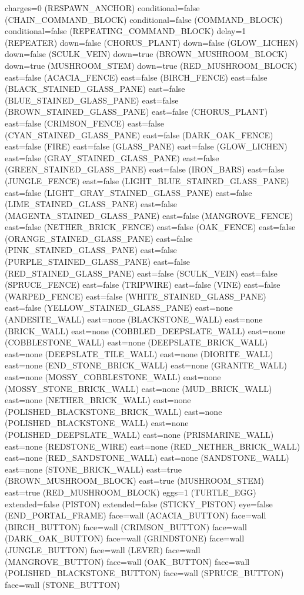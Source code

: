 \documentclass[11pt]{article}
\begin{document}
charges=0 (RESPAWN_ANCHOR)
conditional=false (CHAIN_COMMAND_BLOCK)
conditional=false (COMMAND_BLOCK)
conditional=false (REPEATING_COMMAND_BLOCK)
delay=1 (REPEATER)
down=false (CHORUS_PLANT)
down=false (GLOW_LICHEN)
down=false (SCULK_VEIN)
down=true (BROWN_MUSHROOM_BLOCK)
down=true (MUSHROOM_STEM)
down=true (RED_MUSHROOM_BLOCK)
east=false (ACACIA_FENCE)
east=false (BIRCH_FENCE)
east=false (BLACK_STAINED_GLASS_PANE)
east=false (BLUE_STAINED_GLASS_PANE)
east=false (BROWN_STAINED_GLASS_PANE)
east=false (CHORUS_PLANT)
east=false (CRIMSON_FENCE)
east=false (CYAN_STAINED_GLASS_PANE)
east=false (DARK_OAK_FENCE)
east=false (FIRE)
east=false (GLASS_PANE)
east=false (GLOW_LICHEN)
east=false (GRAY_STAINED_GLASS_PANE)
east=false (GREEN_STAINED_GLASS_PANE)
east=false (IRON_BARS)
east=false (JUNGLE_FENCE)
east=false (LIGHT_BLUE_STAINED_GLASS_PANE)
east=false (LIGHT_GRAY_STAINED_GLASS_PANE)
east=false (LIME_STAINED_GLASS_PANE)
east=false (MAGENTA_STAINED_GLASS_PANE)
east=false (MANGROVE_FENCE)
east=false (NETHER_BRICK_FENCE)
east=false (OAK_FENCE)
east=false (ORANGE_STAINED_GLASS_PANE)
east=false (PINK_STAINED_GLASS_PANE)
east=false (PURPLE_STAINED_GLASS_PANE)
east=false (RED_STAINED_GLASS_PANE)
east=false (SCULK_VEIN)
east=false (SPRUCE_FENCE)
east=false (TRIPWIRE)
east=false (VINE)
east=false (WARPED_FENCE)
east=false (WHITE_STAINED_GLASS_PANE)
east=false (YELLOW_STAINED_GLASS_PANE)
east=none (ANDESITE_WALL)
east=none (BLACKSTONE_WALL)
east=none (BRICK_WALL)
east=none (COBBLED_DEEPSLATE_WALL)
east=none (COBBLESTONE_WALL)
east=none (DEEPSLATE_BRICK_WALL)
east=none (DEEPSLATE_TILE_WALL)
east=none (DIORITE_WALL)
east=none (END_STONE_BRICK_WALL)
east=none (GRANITE_WALL)
east=none (MOSSY_COBBLESTONE_WALL)
east=none (MOSSY_STONE_BRICK_WALL)
east=none (MUD_BRICK_WALL)
east=none (NETHER_BRICK_WALL)
east=none (POLISHED_BLACKSTONE_BRICK_WALL)
east=none (POLISHED_BLACKSTONE_WALL)
east=none (POLISHED_DEEPSLATE_WALL)
east=none (PRISMARINE_WALL)
east=none (REDSTONE_WIRE)
east=none (RED_NETHER_BRICK_WALL)
east=none (RED_SANDSTONE_WALL)
east=none (SANDSTONE_WALL)
east=none (STONE_BRICK_WALL)
east=true (BROWN_MUSHROOM_BLOCK)
east=true (MUSHROOM_STEM)
east=true (RED_MUSHROOM_BLOCK)
eggs=1 (TURTLE_EGG)
extended=false (PISTON)
extended=false (STICKY_PISTON)
eye=false (END_PORTAL_FRAME)
face=wall (ACACIA_BUTTON)
face=wall (BIRCH_BUTTON)
face=wall (CRIMSON_BUTTON)
face=wall (DARK_OAK_BUTTON)
face=wall (GRINDSTONE)
face=wall (JUNGLE_BUTTON)
face=wall (LEVER)
face=wall (MANGROVE_BUTTON)
face=wall (OAK_BUTTON)
face=wall (POLISHED_BLACKSTONE_BUTTON)
face=wall (SPRUCE_BUTTON)
face=wall (STONE_BUTTON)
\end{document}

